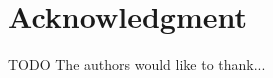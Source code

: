 \documentclass[journal]{IEEEtran}
\begin{document}

\section*{Acknowledgment}

TODO
The authors would like to thank...


\ifCLASSOPTIONcaptionsoff
  \newpage
\fi





%
%
%

\end{document}
